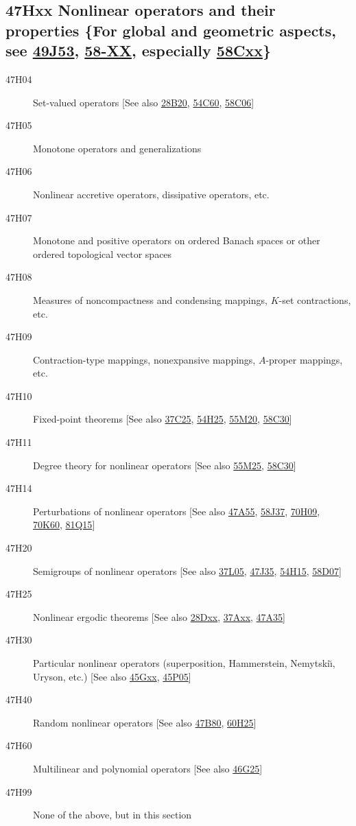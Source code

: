 \documentclass[letterpaper]{article}
\begin{document}
\subsection*{47Hxx  Nonlinear operators and their properties \{For global and geometric aspects, see \hyperref[49J53]{49J53}, \hyperref[58-XX]{58-XX}, especially \hyperref[58Cxx]{58Cxx}\} }\label{47Hxx}
\begin{description}  
\item [47H04]\label{47H04} Set-valued operators [See also \hyperref[28B20]{28B20}, \hyperref[54C60]{54C60}, \hyperref[58C06]{58C06}]
\item [47H05]\label{47H05} Monotone operators and generalizations
\item [47H06]\label{47H06} Nonlinear accretive operators, dissipative operators, etc.
\item [47H07]\label{47H07} Monotone and positive operators on ordered Banach spaces or other ordered topological vector spaces
\item [47H08]\label{47H08} Measures of noncompactness and condensing mappings, $K$-set contractions, etc.
\item [47H09]\label{47H09} Contraction-type mappings, nonexpansive mappings, $A$-proper mappings, etc.
\item [47H10]\label{47H10} Fixed-point theorems [See also \hyperref[37C25]{37C25}, \hyperref[54H25]{54H25}, \hyperref[55M20]{55M20}, \hyperref[58C30]{58C30}]
\item [47H11]\label{47H11} Degree theory for nonlinear operators [See also \hyperref[55M25]{55M25}, \hyperref[58C30]{58C30}]
\item [47H14]\label{47H14} Perturbations of nonlinear operators [See also \hyperref[47A55]{47A55}, \hyperref[58J37]{58J37}, \hyperref[70H09]{70H09}, \hyperref[70K60]{70K60}, \hyperref[81Q15]{81Q15}]
\item [47H20]\label{47H20} Semigroups of nonlinear operators [See also \hyperref[37L05]{37L05}, \hyperref[47J35]{47J35}, \hyperref[54H15]{54H15}, \hyperref[58D07]{58D07}]
\item [47H25]\label{47H25} Nonlinear ergodic theorems [See also \hyperref[28Dxx]{28Dxx}, \hyperref[37Axx]{37Axx}, \hyperref[47A35]{47A35}]
\item [47H30]\label{47H30} Particular nonlinear operators (superposition, Hammerstein, Nemytski\u{\i}, Uryson, etc.) [See also \hyperref[45Gxx]{45Gxx}, \hyperref[45P05]{45P05}]
\item [47H40]\label{47H40} Random nonlinear operators [See also \hyperref[47B80]{47B80}, \hyperref[60H25]{60H25}]
\item [47H60]\label{47H60} Multilinear and polynomial operators [See also \hyperref[46G25]{46G25}]
\item [47H99]\label{47H99} None of the above, but in this section
\end{description}
\end{document}
